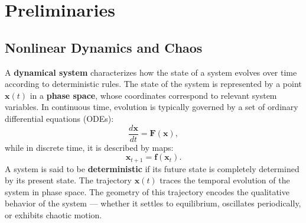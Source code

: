 \documentclass[a4paper,12pt]{article}
\begin{document}
\section{Preliminaries}
\label{sec:preliminaries}


\subsection{Nonlinear Dynamics and Chaos}
\label{subsec:nonlinear_dynamics}

A \textbf{dynamical system} characterizes how the state of a system evolves over time according to deterministic rules. The state of the system is represented by a point $\mathbf{x}(t)$ in a \textbf{phase space}, whose coordinates correspond to relevant system variables. In continuous time, evolution is typically governed by a set of ordinary differential equations (ODEs):
\begin{equation}
    \frac{d\mathbf{x}}{dt} = \mathbf{F}(\mathbf{x}),
\end{equation}
while in discrete time, it is described by maps:
\begin{equation}
    \mathbf{x}_{t+1} = \mathbf{f}(\mathbf{x}_t).
\end{equation}
A system is said to be \textbf{deterministic} if its future state is completely determined by its present state. The trajectory $\mathbf{x}(t)$ traces the temporal evolution of the system in phase space. The geometry of this trajectory encodes the qualitative behavior of the system — whether it settles to equilibrium, oscillates periodically, or exhibits chaotic motion. 

\end{document}
